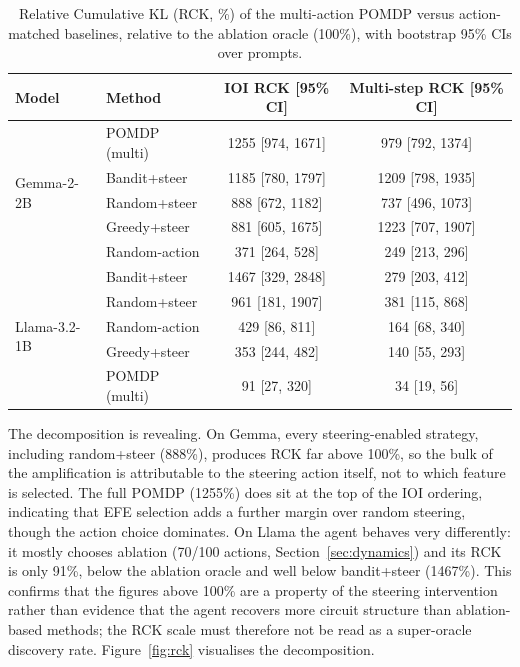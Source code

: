 \begin{table}[H]
\centering
\caption{Relative Cumulative KL (RCK, \%) of the multi-action POMDP
versus action-matched baselines, relative to the ablation oracle (100\%),
with bootstrap 95\% CIs over prompts.}
\label{tab:rck}
{\small
\begin{tabular}{llcc}
\toprule
\textbf{Model} & \textbf{Method} & \textbf{IOI RCK [95\% CI]} & \textbf{Multi-step RCK [95\% CI]} \\
\midrule
\multirow{5}{*}{Gemma-2-2B}
 & POMDP (multi) & 1255 [974, 1671] & 979 [792, 1374] \\
 & Bandit+steer  & 1185 [780, 1797] & 1209 [798, 1935] \\
 & Random+steer  & 888 [672, 1182]  & 737 [496, 1073] \\
 & Greedy+steer  & 881 [605, 1675]  & 1223 [707, 1907] \\
 & Random-action & 371 [264, 528]   & 249 [213, 296] \\
\midrule
\multirow{5}{*}{Llama-3.2-1B}
 & Bandit+steer  & 1467 [329, 2848] & 279 [203, 412] \\
 & Random+steer  & 961 [181, 1907]  & 381 [115, 868] \\
 & Random-action & 429 [86, 811]    & 164 [68, 340] \\
 & Greedy+steer  & 353 [244, 482]   & 140 [55, 293] \\
 & POMDP (multi) & 91 [27, 320]     & 34 [19, 56] \\
\bottomrule
\end{tabular}
}
\end{table}

The decomposition is revealing.  On Gemma, every steering-enabled
strategy, including random+steer (888\%), produces RCK far above
100\%, so the bulk of the amplification is attributable to the
steering action itself, not to which feature is selected.  The full
POMDP (1255\%) does sit at the top of the IOI ordering, indicating
that EFE selection adds a further margin over random steering, though the
action choice dominates.  On Llama the agent behaves very differently:
it mostly chooses ablation (70/100 actions, Section~\ref{sec:dynamics})
and its RCK is only 91\%, below the ablation oracle and well below
bandit+steer (1467\%).  This confirms that the figures above 100\% are a
property of the steering intervention rather than evidence that the
agent recovers more circuit structure than ablation-based methods; the
RCK scale must therefore not be read as a super-oracle discovery rate.
Figure~\ref{fig:rck} visualises the decomposition.


